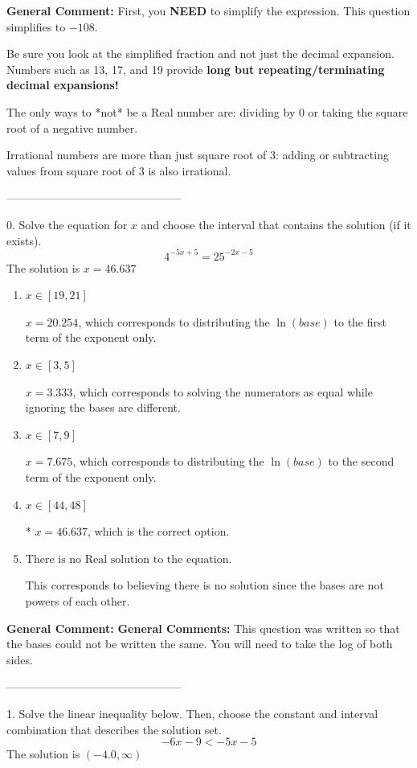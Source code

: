 \documentclass{extbook}[14pt]
\begin{document}
\textbf{General Comment:} First, you \textbf{NEED} to simplify the expression. This question simplifies to $-108$. 
 
 Be sure you look at the simplified fraction and not just the decimal expansion. Numbers such as 13, 17, and 19 provide \textbf{long but repeating/terminating decimal expansions!} 
 
 The only ways to *not* be a Real number are: dividing by 0 or taking the square root of a negative number. 
 
 Irrational numbers are more than just square root of 3: adding or subtracting values from square root of 3 is also irrational. 

-----------------------------------------------

0. Solve the equation for $x$ and choose the interval that contains the solution (if it exists).
\[ 4^{-5x+5} = 25^{-2x-5} \] 
The solution is $ x = 46.637 $ 

\begin{enumerate}[label=\Alph*.] 
\item $ x \in [19, 21] $ 

 $x = 20.254$, which corresponds to distributing the $\ln(base)$ to the first term of the exponent only. 
\item $ x \in [3, 5] $ 

 $x = 3.333$, which corresponds to solving the numerators as equal while ignoring the bases are different. 
\item $ x \in [7, 9] $ 

 $x = 7.675$, which corresponds to distributing the $\ln(base)$ to the second term of the exponent only. 
\item $ x \in [44, 48] $ 

 * $x = 46.637$, which is the correct option. 
\item $ \text{There is no Real solution to the equation.} $ 

 This corresponds to believing there is no solution since the bases are not powers of each other. 
\end{enumerate} 
 
\textbf{General Comment:} \textbf{General Comments:} This question was written so that the bases could not be written the same. You will need to take the log of both sides. 

-----------------------------------------------

1. Solve the linear inequality below. Then, choose the constant and interval combination that describes the solution set.
\[ -6x -9 < -5x -5 \] 
The solution is $ (-4.0, \infty) $ 
\end{document}
